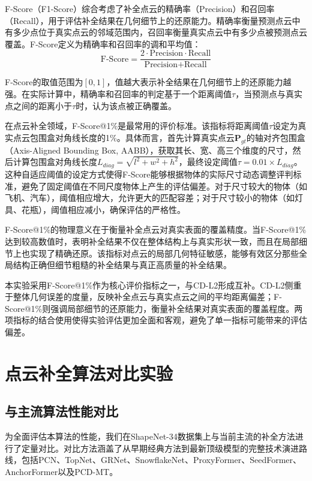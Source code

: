 F-Score（F1-Score）综合考虑了补全点云的精确率（Precision）和召回率（Recall），用于评估补全结果在几何细节上的还原能力。精确率衡量预测点云中有多少点位于真实点云的邻域范围内，召回率衡量真实点云中有多少点被预测点云覆盖。F-Score定义为精确率和召回率的调和平均值：
\begin{equation}
\text{F-Score} = \frac{2 \cdot \text{Precision} \cdot \text{Recall}}{\text{Precision} + \text{Recall}}
\end{equation}

F-Score的取值范围为$[0, 1]$，值越大表示补全结果在几何细节上的还原能力越强。在实际计算中，精确率和召回率的判定基于一个距离阈值$\tau$，当预测点与真实点之间的距离小于$\tau$时，认为该点被正确覆盖。

在点云补全领域，F-Score@1\%是最常用的评价标准。该指标将距离阈值$\tau$设定为真实点云包围盒对角线长度的1\%。具体而言，首先计算真实点云$\mathbf{P}_{gt}$的轴对齐包围盒（Axis-Aligned Bounding Box, AABB），获取其长、宽、高三个维度的尺寸，然后计算包围盒对角线长度$L_{diag} = \sqrt{l^2 + w^2 + h^2}$，最终设定阈值$\tau = 0.01 \times L_{diag}$。这种自适应阈值的设定方式使得F-Score能够根据物体的实际尺寸动态调整评判标准，避免了固定阈值在不同尺度物体上产生的评估偏差。对于尺寸较大的物体（如飞机、汽车），阈值相应增大，允许更大的匹配容差；对于尺寸较小的物体（如灯具、花瓶），阈值相应减小，确保评估的严格性。

F-Score@1\%的物理意义在于衡量补全点云对真实表面的覆盖精度。当F-Score@1\%达到较高数值时，表明补全结果不仅在整体结构上与真实形状一致，而且在局部细节上也实现了精确还原。该指标对点云的局部几何特征敏感，能够有效区分那些全局结构正确但细节粗糙的补全结果与真正高质量的补全结果。

本实验采用F-Score@1\%作为核心评价指标之一，与CD-L2形成互补。CD-L2侧重于整体几何误差的度量，反映补全点云与真实点云之间的平均距离偏差；F-Score@1\%则强调局部细节的还原能力，衡量补全结果对真实表面的覆盖程度。两项指标的结合使用使得实验评估更加全面和客观，避免了单一指标可能带来的评估偏差。

\section{点云补全算法对比实验}

\subsection{与主流算法性能对比}

为全面评估本算法的性能，我们在ShapeNet-34数据集上与当前主流的补全方法进行了定量对比。对比方法涵盖了从早期经典方法到最新顶级模型的完整技术演进路线，包括PCN\cite{yuan2018pcn}、TopNet\cite{tchapmi2019topnet}、GRNet\cite{xie2020grnet}、SnowflakeNet\cite{xiang2021snowflakenet}、ProxyFormer\cite{li2023proxyformer}、SeedFormer\cite{zhou2022seedformer}、AnchorFormer\cite{chen2023anchorformer}以及PCD-MT\cite{li2026ppcmt}。

